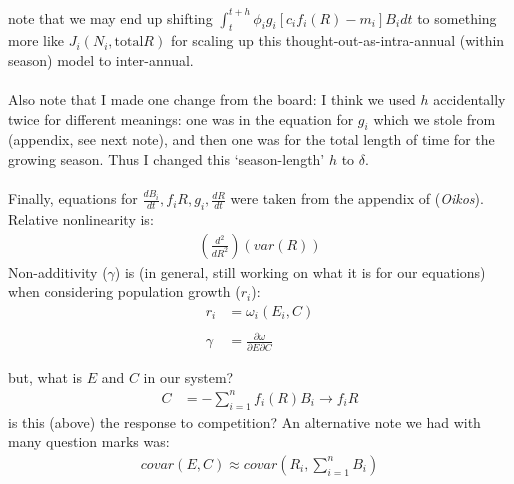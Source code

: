 \documentclass[11pt,a4paper,oneside]{article}
\begin{document}
\noindent note that we may end up shifting \(\int_t^{t+h}\phi_{i}g_{i}[c_{i}f_{i}(R) -
m_{i}]B_{i}dt\) to something more like \(J_{i}(N_{i}, \text{total
}R)\) for scaling up this thought-out-as-intra-annual (within season)
model to inter-annual.
\\
\\
\noindent Also note that I made one change from the board: I think we
used \(h\) accidentally twice for different meanings: one was in the
equation for \(g_{i}\) which we stole from \cite{Chesson:2004eo}
(appendix, see next note), and then one was for the total length of time for the
growing season. Thus I changed this `season-length' \(h\) to
\(\delta\).
\\
\\
\noindent Finally, equations for \(\frac{dB_{i}}{dt}, f_{i}R, g_{i},
\frac{dR}{dt}\) were taken from the appendix of \cite{Chesson:2004eo} (\emph{Oikos}).
\newpage
{}\\
\noindent Relative nonlinearity is:
\begin{align*}
\left(\frac{d^{2}}{dR^{2}}\right)(var(R))
\end{align*}
\noindent Non-additivity (\(\gamma\)) is (in general, still working on
what it is for our equations) when considering population growth
(\(r_{i}\)):
\begin{align*}
r_{i} & = \omega_{i}(E_{i}, C)
\\
\\
\gamma & = \frac{\partial \omega}{\partial E \partial C} 
\end{align*}

\noindent but, what is \(E\) and \(C\) in our system?
\begin{align*}
C & = - \sum_{i=1}^{n}f_{i}(R)B_{i} \rightarrow f_{i}R
\end{align*}
\noindent is this (above) the response to
  competition? An alternative note we had with many question marks
  was:
\begin{align*}
covar(E,C) \approx covar\left(R_{i}, \sum_{i=1}^{n}B_{i}\right)
\end{align*}

\newpage


\end{document}

